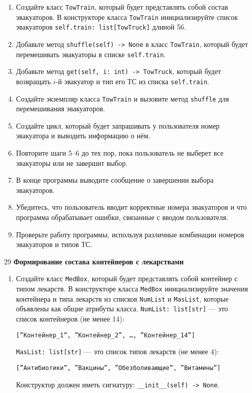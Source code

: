 \begin{enumerate}
\begin{enumerate}
    \item Создайте класс \texttt{TowTrain}, который будет представлять собой состав эвакуаторов. В конструкторе класса \texttt{TowTrain} инициализируйте список эвакуаторов \texttt{self.train: list[TowTruck]} длиной 56.

    \item Добавьте метод \texttt{shuffle(self) -> None} в класс \texttt{TowTrain}, который будет перемешивать эвакуаторы в списке \texttt{self.train}.

    \item Добавьте метод \texttt{get(self, i: int) -> TowTruck}, который будет возвращать $i$-й эвакуатор и тип его ТС из списка \texttt{self.train}.

    \item Создайте экземпляр класса \texttt{TowTrain} и вызовите метод \texttt{shuffle} для перемешивания эвакуаторов.

    \item Создайте цикл, который будет запрашивать у пользователя номер эвакуатора и выводить информацию о нём.

    \item Повторите шаги 5–6 до тех пор, пока пользователь не выберет все эвакуаторы или не завершит выбор.

    \item В конце программы выводите сообщение о завершении выбора эвакуаторов.

    \item Убедитесь, что пользователь вводит корректные номера эвакуаторов и что программа обрабатывает ошибки, связанные с вводом пользователя.

    \item Проверьте работу программы, используя различные комбинации номеров эвакуаторов и типов ТС.
\end{enumerate}

\item[29] \textbf{Формирование состава контейнеров с лекарствами}
\begin{enumerate}
    \item Создайте класс \texttt{MedBox}, который будет представлять собой контейнер с типом лекарств. В конструкторе класса \texttt{MedBox} инициализируйте значения контейнера и типа лекарств из списков \texttt{NumList} и \texttt{MasList}, которые объявлены как общие атрибуты класса. \texttt{NumList: list[str]} — это список контейнеров (не менее 14): 
    \begin{center}
        \texttt{[''Контейнер\_1'', ''Контейнер\_2'', \dots, ''Контейнер\_14'']}
    \end{center}
    \texttt{MasList: list[str]} — это список типов лекарств (не менее 4):
    \begin{center}
        \texttt{[''Антибиотики'', ''Вакцины'', ''Обезболивающие'', ''Витамины'']}
    \end{center}
    Конструктор должен иметь сигнатуру: \texttt{\_\_init\_\_(self) -> None}.


\end{enumerate}
\end{enumerate}
